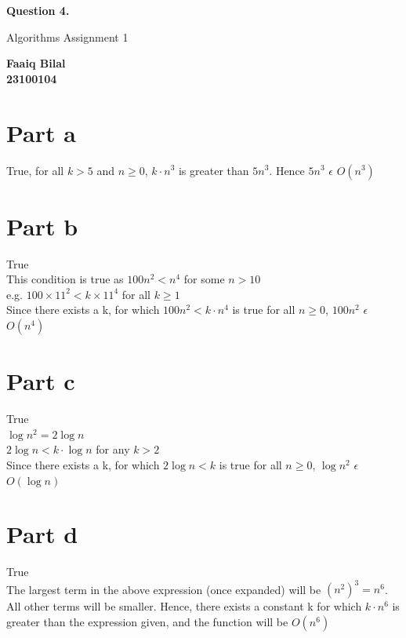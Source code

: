 \documentclass[]{article}
\begin{document}
\begin{center}
    \vspace*{1cm}

    \textbf{Question 4.}

    \vspace{0.5cm}
     Algorithms Assignment 1

    \vspace{0.15cm}

    \textbf{Faaiq Bilal} \\ 
    \textbf{23100104}
         
\end{center}

\section{Part a}
True, for all $k>5$ and $n \geq 0$, $k \cdot{n^3}$ is greater than $5n^3$. Hence $5n^3$  $ \epsilon $ $O(n^3) $ \\



\section{Part b}
True \\
This condition is true as $ 100n^2 < n^4$ for some $ n > 10 $\\
e.g. $100 \times 11^2 < k \times 11^4$ for all $ k \geq 1 $ \\
Since there exists a k, for which $100n^2 < k \cdot n^4 $ is true for all $ n \geq 0 $, $ 100n^2 $ $\epsilon $ $O(n^4)$

\section{Part c}
True \\
$ \log n^2 = 2 \log n$ \\ 
$ 2 \log n < k \cdot \log n$ for any $k > 2$ \\ 
Since there exists a k, for which $2 \log n < k $ is true for all $ n \geq 0 $, $ \log n^2 $ $\epsilon $ $O(\log n)$

\section{Part d}
True \\ 
The largest term in the above expression (once expanded) will be $ (n^2)^3 = n^6$. All other terms will be smaller. Hence, there exists a constant k for which $k \cdot n^6 $ is greater than the expression given, and the function will be $O(n^6)$\\
\end{document}
